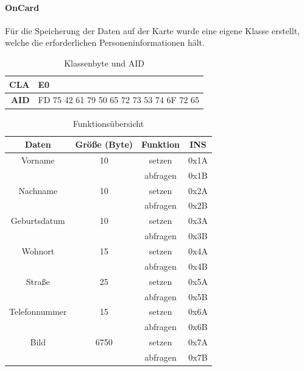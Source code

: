 \documentclass[	a4paper,
			11pt,
			oneside,
			parskip]{scrartcl}
\begin{document}
\paragraph{OnCard} Für die Speicherung der Daten auf der Karte wurde eine eigene  Klasse erstellt, welche die erforderlichen Personeninformationen hält.

\begin{table}[htbp]
  \centering
  \caption{Klassenbyte und AID}
    \begin{tabular}{rr}
    \toprule
    \textbf{CLA} & \multicolumn{1}{l}{E0} \\
    \midrule
    \textbf{AID} & FD 75 42 61 79 50 65 72 73 53 74 6F 72 65 \\
    \bottomrule
    \end{tabular}%
  \label{tab:addlabel}%
\end{table}%

\begin{table}[H]
  \centering
  \caption{Funktionsübersicht}
    \begin{tabular}{crcc}
    \toprule
    \textbf{Daten} & \multicolumn{1}{c}{\textbf{Größe (Byte)}} & \textbf{Funktion} & \textbf{INS} \\
    \midrule
    Vorname & \multicolumn{1}{c}{10} & setzen & 0x1A \\
          & \multicolumn{1}{c}{} & abfragen & 0x1B \\
    Nachname & \multicolumn{1}{c}{10} & setzen & 0x2A \\
          & \multicolumn{1}{c}{} & abfragen & 0x2B \\
    Geburtsdatum & \multicolumn{1}{c}{10} & setzen & 0x3A \\
          & \multicolumn{1}{c}{} & abfragen & 0x3B \\
    Wohnort & \multicolumn{1}{c}{15} & setzen & 0x4A \\
          & \multicolumn{1}{c}{} & abfragen & 0x4B \\
    Straße & \multicolumn{1}{c}{25} & setzen & 0x5A \\
          & \multicolumn{1}{c}{} & abfragen & 0x5B \\
    Telefonnummer & \multicolumn{1}{c}{15} & setzen & 0x6A \\
          & \multicolumn{1}{c}{} & abfragen & 0x6B \\
    Bild  & \multicolumn{1}{c}{6750} & setzen & 0x7A \\
          &       & abfragen & 0x7B \\
    \bottomrule
    \end{tabular}%
  \label{tab:persdata}%
\end{table}%
\end{document}
